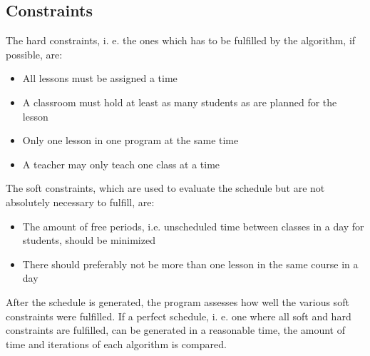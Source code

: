 \documentclass[titlepage,a4paper]{article}
\begin{document}
\subsection{Constraints}
The hard constraints, i. e. the ones which has to be fulfilled by the algorithm, if possible, are:
\begin{itemize}
  \item All lessons must be assigned a time
  \item A classroom must hold at least as many students as are planned for the lesson
  \item Only one lesson in one program at the same time
  \item A teacher may only teach one class at a time
\end{itemize} 
\medskip
The soft constraints, which are used to evaluate the schedule but are not absolutely necessary to fulfill, are:
\begin{itemize}
  \item The amount of free periods, i.e. unscheduled time between classes in a day for students, should be minimized
  \item There should preferably not be more than one lesson in the same course in a day
\end{itemize}
\medskip
After the schedule is generated, the program assesses how well the various soft constraints were fulfilled. If a perfect schedule, i. e. one where all soft and hard constraints are fulfilled, can be generated in a reasonable time, the amount of time and iterations of each algorithm is compared. \\\\
\end{document}
